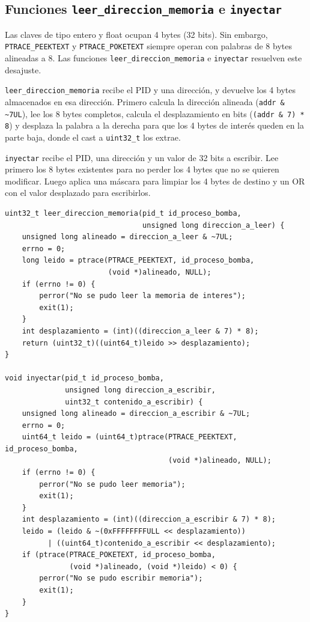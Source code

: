 \documentclass[10pt,a4paper]{article}
\begin{document}
\subsection{Funciones \texttt{leer\_direccion\_memoria} e \texttt{inyectar}}

Las claves de tipo entero y float ocupan 4 bytes (32 bits). Sin embargo, \texttt{PTRACE\_PEEKTEXT} y \texttt{PTRACE\_POKETEXT} siempre operan con palabras de 8 bytes alineadas a 8. Las funciones \texttt{leer\_direccion\_memoria} e \texttt{inyectar} resuelven este desajuste.

\texttt{leer\_direccion\_memoria} recibe el PID y una dirección, y devuelve los 4 bytes almacenados en esa dirección. Primero calcula la dirección alineada (\texttt{addr \& \textasciitilde7UL}), lee los 8 bytes completos, calcula el desplazamiento en bits (\texttt{(addr \& 7) * 8}) y desplaza la palabra a la derecha para que los 4 bytes de interés queden en la parte baja, donde el cast a \texttt{uint32\_t} los extrae.

\texttt{inyectar} recibe el PID, una dirección y un valor de 32 bits a escribir. Lee primero los 8 bytes existentes para no perder los 4 bytes que no se quieren modificar. Luego aplica una máscara para limpiar los 4 bytes de destino y un OR con el valor desplazado para escribirlos.

\begin{lstlisting}[style=cstyle, caption={Funciones leer\_direccion\_memoria e inyectar}]
uint32_t leer_direccion_memoria(pid_t id_proceso_bomba,
                                unsigned long direccion_a_leer) {
    unsigned long alineado = direccion_a_leer & ~7UL;
    errno = 0;
    long leido = ptrace(PTRACE_PEEKTEXT, id_proceso_bomba,
                        (void *)alineado, NULL);
    if (errno != 0) {
        perror("No se pudo leer la memoria de interes");
        exit(1);
    }
    int desplazamiento = (int)((direccion_a_leer & 7) * 8);
    return (uint32_t)((uint64_t)leido >> desplazamiento);
}

void inyectar(pid_t id_proceso_bomba,
              unsigned long direccion_a_escribir,
              uint32_t contenido_a_escribir) {
    unsigned long alineado = direccion_a_escribir & ~7UL;
    errno = 0;
    uint64_t leido = (uint64_t)ptrace(PTRACE_PEEKTEXT, id_proceso_bomba,
                                      (void *)alineado, NULL);
    if (errno != 0) {
        perror("No se pudo leer memoria");
        exit(1);
    }
    int desplazamiento = (int)((direccion_a_escribir & 7) * 8);
    leido = (leido & ~(0xFFFFFFFFULL << desplazamiento))
          | ((uint64_t)contenido_a_escribir << desplazamiento);
    if (ptrace(PTRACE_POKETEXT, id_proceso_bomba,
               (void *)alineado, (void *)leido) < 0) {
        perror("No se pudo escribir memoria");
        exit(1);
    }
}
\end{lstlisting}
\end{document}
